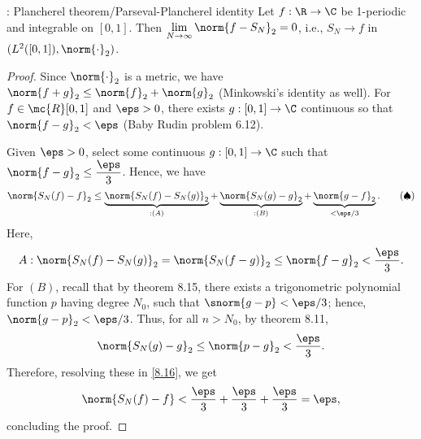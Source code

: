 \begin{ntheorem}{: Plancherel theorem/Parseval-Plancherel identity}
    Let \(f:\R\to\C\) be 1-periodic and integrable on \([0,1]\). Then \(\displaystyle\lim_{N\to\infty}\norm{f-S_N}_2=0\), i.e., \(S_N\to f\) in \((L^2([0,1]),\norm{\cdot}_2)\).
\end{ntheorem}
\begin{proof}
    Since \(\norm{\cdot}_2\) is a metric, we have \(\norm{f+g}_2\leq\norm{f}_2+\norm{g}_2\) (Minkowski's identity as well). For \(f\in\mc{R}[0,1]\) and \(\eps>0\), there exists \(g:[0,1]\to\C\) continuous so that \(\norm{f-g}_2<\eps\) (Baby Rudin problem 6.12).

    \medskip

    Given \(\eps>0\), select some continuous \(g:[0,1]\to\C\) such that \(\norm{f-g}_2\leq \displaystyle\frac{\eps}{3}\). Hence, we have 
    \begin{equation*} 
        \norm{S_N(f)-f}_2\leq\underbrace{\norm{S_N(f)-S_N(g)}_2}_{:(A)}+\underbrace{\norm{S_N(g)-g}_2}_{:(B)}+\underbrace{\norm{g-f}_2}_{<\eps/3}.\tag{\(\spadesuit\)}\label{8.16}
    \end{equation*}
    Here, 
    \begin{equation*} 
        A:\norm{S_N(f)-S_N(g)}_2=\norm{S_N(f-g)}_2\leq\norm{f-g}_2<\frac{\eps}{3}.
    \end{equation*}
    For \((B)\), recall that by theorem 8.15, there exists a trigonometric polynomial function \(p\) having degree \(N_0\), such that \(\snorm{g-p}<\eps/3\); hence, \(\norm{g-p}_2<\eps/3\). Thus, for all \(n>N_0\), by theorem 8.11,
    \begin{equation*} 
        \norm{S_N(g)-g}_2\leq\norm{p-g}_2<\frac{\eps}{3}.
    \end{equation*}
    Therefore, resolving these in \cref{8.16}, we get 
    \begin{equation*} 
        \norm{S_N(f)-f}<\frac{\eps}{3}+\frac{\eps}{3}+\frac{\eps}{3}=\eps,
    \end{equation*}
    concluding the proof.
\end{proof}

